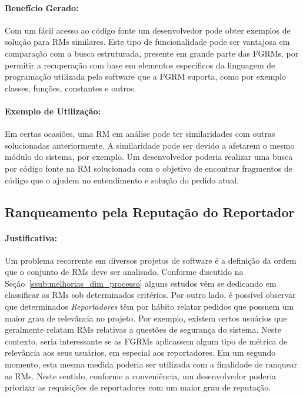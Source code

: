 \paragraph{Benefício Gerado:}
\label{par:beneficios_s02}

Com um fácil acesso ao código fonte um desenvolvedor pode obter exemplos de
solução para RMs similares. Este tipo de funcionalidade pode ser vantajosa em
comparação com a busca estruturada, presente em grande parte das FGRMs, por
permitir a recuperação com base em elementos específicos da linguagem de
programação utilizada pelo software que a FGRM suporta, como por exemplo
classes, funções, constantes e outros.

\paragraph{Exemplo de Utilização:}
\label{par:exemplo_s02}

Em certas ocasiões, uma RM em análise pode ter similaridades com outras
solucionadas anteriormente. A similaridade pode ser devido a afetarem o mesmo
módulo do sistema, por exemplo. Um desenvolvedor poderia realizar uma busca por
código fonte na RM solucionada com o objetivo de encontrar fragmentos de código
que o ajudem no entendimento e solução do pedido atual.

\subsection{Ranqueamento pela Reputação do Reportador}
\label{sub:diferenciacao_do_reportdor}


\paragraph{Justificativa:}
\label{par:justificativa_s03}

Um problema recorrente em diversos projetos de software é a definição da ordem
que o conjunto de RMs deve ser analisado. Conforme discutido na
Seção~\ref{ssub:melhorias_dim_processo} alguns estudos vêm se dedicando em
classificar as RMs sob determinados critérios. Por outro lado, é possível
observar que determinados \textit{Reportadores} têm por hábito relatar pedidos
que possuem um maior grau de relevância no projeto. Por exemplo, existem certos
usuários que geralmente relatam RMs relativas a questões de segurança do
sistema. Neste contexto, seria interessante se as FGRMs aplicassem algum tipo
de métrica de relevância aos seus usuários, em especial aos reportadores. Em um
segundo momento, esta mesma medida poderia ser utilizada com a finalidade de
ranquear as RMs. Neste sentido, conforme a conveniência, um desenvolvedor
poderia priorizar as requisições de reportadores com um maior grau de
reputação.


